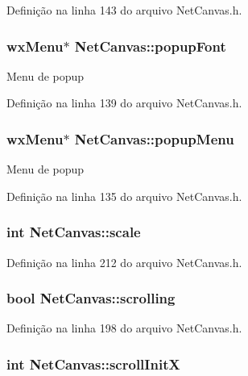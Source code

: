 Definição na linha 143 do arquivo Net\+Canvas.\+h.

\subsubsection[{popup\+Font}]{\setlength{\rightskip}{0pt plus 5cm}wx\+Menu$\ast$ Net\+Canvas\+::popup\+Font}\label{class_net_canvas_a77492003c923030bb66ef25ed130f080}
Menu de popup 

Definição na linha 139 do arquivo Net\+Canvas.\+h.

\subsubsection[{popup\+Menu}]{\setlength{\rightskip}{0pt plus 5cm}wx\+Menu$\ast$ Net\+Canvas\+::popup\+Menu}\label{class_net_canvas_a1505f9cbb7b63745f498aacafe2769c6}
Menu de popup 

Definição na linha 135 do arquivo Net\+Canvas.\+h.

\subsubsection[{scale}]{\setlength{\rightskip}{0pt plus 5cm}int Net\+Canvas\+::scale}\label{class_net_canvas_af349804830b7daa9511bd50621604bcd}


Definição na linha 212 do arquivo Net\+Canvas.\+h.

\subsubsection[{scrolling}]{\setlength{\rightskip}{0pt plus 5cm}bool Net\+Canvas\+::scrolling}\label{class_net_canvas_a9822a6c09031ec2b8fc96586efcc2dd3}


Definição na linha 198 do arquivo Net\+Canvas.\+h.

\subsubsection[{scroll\+InitX}]{\setlength{\rightskip}{0pt plus 5cm}int Net\+Canvas\+::scroll\+InitX}\label{class_net_canvas_a5609ffb2345f53b5895bc2201461e2ae}


